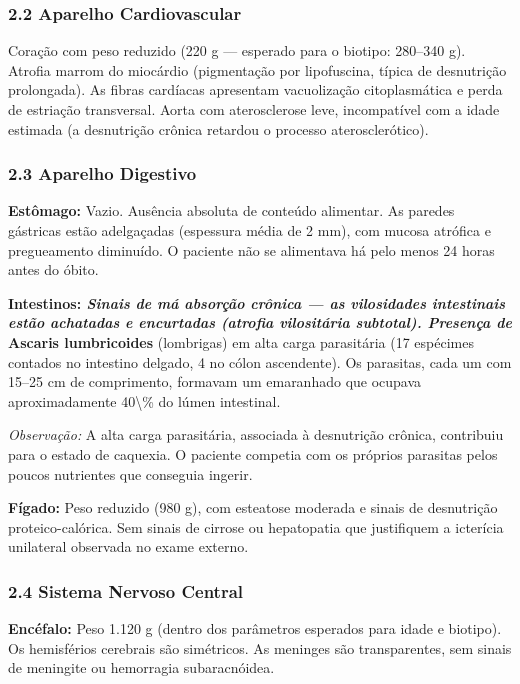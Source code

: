 \subsubsection*{2.2 Aparelho Cardiovascular}

\noindent Coração com peso reduzido (220 g --- esperado para o biotipo: 280--340 g). Atrofia marrom do miocárdio (pigmentação por lipofuscina, típica de desnutrição prolongada). As fibras cardíacas apresentam vacuolização citoplasmática e perda de estriação transversal. Aorta com aterosclerose leve, incompatível com a idade estimada (a desnutrição crônica retardou o processo aterosclerótico).

\subsubsection*{2.3 Aparelho Digestivo}

\noindent \textbf{Estômago:} Vazio. Ausência absoluta de conteúdo alimentar. As paredes gástricas estão adelgaçadas (espessura média de 2 mm), com mucosa atrófica e pregueamento diminuído. O paciente não se alimentava há pelo menos 24 horas antes do óbito.

\noindent \textbf{Intestinos:\textit{ Sinais de má absorção crônica --- as vilosidades intestinais estão achatadas e encurtadas (atrofia vilositária subtotal). Presença de }Ascaris lumbricoides} (lombrigas) em alta carga parasitária (17 espécimes contados no intestino delgado, 4 no cólon ascendente). Os parasitas, cada um com 15--25 cm de comprimento, formavam um emaranhado que ocupava aproximadamente 40\textbackslash{}\% do lúmen intestinal.

\noindent \textit{Observação:} A alta carga parasitária, associada à desnutrição crônica, contribuiu para o estado de caquexia. O paciente competia com os próprios parasitas pelos poucos nutrientes que conseguia ingerir.

\noindent \textbf{Fígado:} Peso reduzido (980 g), com esteatose moderada e sinais de desnutrição proteico-calórica. Sem sinais de cirrose ou hepatopatia que justifiquem a icterícia unilateral observada no exame externo.

\subsubsection*{2.4 Sistema Nervoso Central}

\noindent \textbf{Encéfalo:} Peso 1.120 g (dentro dos parâmetros esperados para idade e biotipo). Os hemisférios cerebrais são simétricos. As meninges são transparentes, sem sinais de meningite ou hemorragia subaracnóidea.

